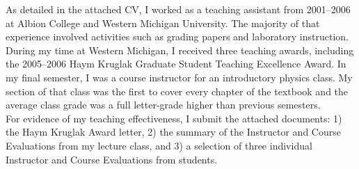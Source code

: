 As detailed in the attached CV, I worked as a teaching assistant from 2001--2006 at Albion College and Western Michigan University.  The majority of that experience involved activities such as grading papers and laboratory instruction.  During my time at Western Michigan, I received three teaching awards, including the 2005--2006 Haym Kruglak Graduate Student Teaching Excellence Award.  In my final semester, I was a course instructor for an introductory physics class.  My section of that class was the first to cover every chapter of the textbook and the average class grade was a full letter-grade higher than previous semesters.\\

For evidence of my teaching effectiveness, I submit the attached documents: 1) the Haym Kruglak Award letter, 2) the summary of the Instructor and Course Evaluations from my lecture class, and 3) a selection of three individual Instructor and Course Evaluations from students.
